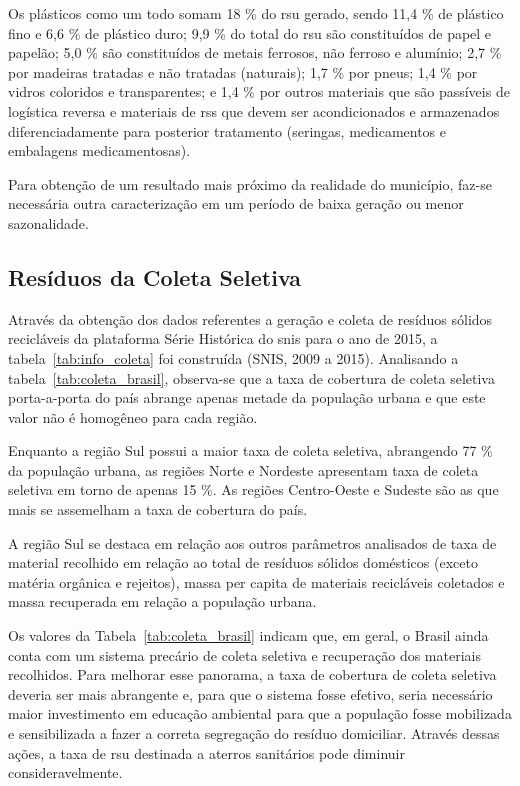 	Os plásticos como um todo somam 18 \% do \gls{rsu} gerado, sendo 11,4 \% de plástico fino e 6,6 \% de plástico duro; 9,9 \% do total do \gls{rsu} são constituídos de papel e papelão; 5,0 \% são constituídos de metais ferrosos, não ferroso e alumínio; 2,7 \% por madeiras tratadas e não tratadas (naturais); 1,7 \% por pneus; 1,4 \% por vidros coloridos e transparentes; e 1,4 \% por outros materiais que são passíveis de logística reversa e  materiais de \gls{rss} que devem ser acondicionados e armazenados diferenciadamente para posterior tratamento (seringas, medicamentos e embalagens medicamentosas).
	
	Para obtenção de um resultado mais próximo da realidade do município, faz-se necessária outra caracterização em um período de baixa geração ou menor sazonalidade.
	
	\subsection{Resíduos da Coleta Seletiva}
		\label{subsec:res_coleta_seletiva}
	
	Através da obtenção dos dados referentes a geração e coleta de resíduos sólidos recicláveis da plataforma Série Histórica do \gls{snis} para o ano de 2015, a tabela~\ref{tab:info_coleta} foi construída (SNIS, 2009 a 2015). Analisando a tabela~\ref{tab:coleta_brasil}, observa-se que a taxa de cobertura de coleta seletiva porta-a-porta do país abrange apenas metade da população urbana e que este valor não é homogêneo para cada região.
	
	Enquanto a região Sul possui a maior taxa de coleta seletiva, abrangendo 77 \% da população urbana, as regiões Norte e Nordeste apresentam taxa de coleta seletiva em torno de apenas 15 \%. As regiões Centro-Oeste e Sudeste são as que mais se assemelham a taxa de cobertura do país.
	
	A região Sul se destaca em relação aos outros parâmetros analisados de taxa de material recolhido em relação ao total de resíduos sólidos domésticos (exceto matéria orgânica e rejeitos), massa per capita de materiais recicláveis coletados e massa recuperada em relação a população urbana.
	
	
	
	Os valores da Tabela~\ref{tab:coleta_brasil} indicam que, em geral, o Brasil ainda conta com um sistema precário de coleta seletiva e recuperação dos materiais recolhidos. Para melhorar esse panorama, a taxa de cobertura de coleta seletiva deveria ser mais abrangente e, para que o sistema fosse efetivo, seria necessário maior investimento em educação ambiental para que a população fosse mobilizada e sensibilizada a fazer a correta segregação do resíduo domiciliar. Através dessas ações, a taxa de \gls{rsu} destinada a aterros sanitários pode diminuir consideravelmente.
	

